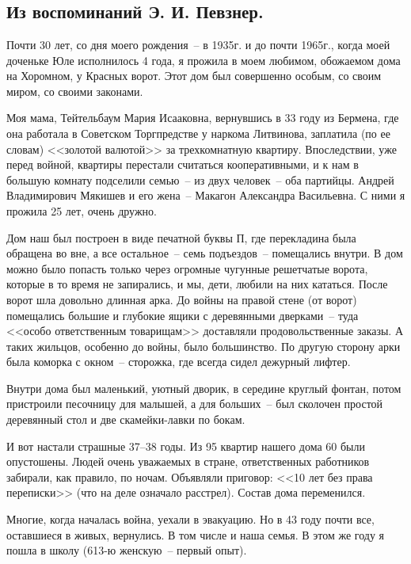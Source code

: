 \chapter{}

\section*{Из воспоминаний Э. И. Певзнер.}

Почти 30 лет, со дня моего рождения~-- в 1935г. и до почти 1965г., когда моей доченьке Юле исполнилось 4 года, я прожила в моем любимом, обожаемом дома на Хоромном, у Красных ворот. Этот дом был совершенно особым, со своим миром, со своими законами.

Моя мама, Тейтельбаум Мария Исааковна, вернувшись в 33 году из Бермена, где она работала в Советском Торгпредстве у наркома Литвинова, заплатила (по ее словам) <<золотой валютой>> за трехкомнатную квартиру. Впоследствии, уже перед войной, квартиры перестали считаться кооперативными, и к нам в большую комнату подселили семью~-- из двух человек~-- оба партийцы. Андрей Владимирович Мякишев и его жена~-- Макагон Александра Васильевна. С ними я прожила 25 лет, очень дружно.

Дом наш был построен в виде печатной буквы П, где перекладина была обращена во вне, а все остальное~-- семь подъездов~-- помещались внутри. В дом можно было попасть только через огромные чугунные решетчатые ворота, которые в то время не запирались, и мы, дети, любили на них кататься. После ворот шла довольно длинная арка. До войны на правой стене (от ворот) помещались большие и глубокие ящики с деревянными дверками~-- туда <<особо ответственным товарищам>> доставляли продовольственные заказы. А таких жильцов, особенно до войны, было большинство. По другую сторону арки была коморка с окном~-- сторожка, где всегда сидел дежурный лифтер.

Внутри дома был маленький, уютный дворик, в середине круглый фонтан, потом пристроили песочницу для малышей, а для больших~-- был сколочен простой деревянный стол и две скамейки-лавки по бокам.

И вот настали страшные 37--38 годы. Из 95 квартир нашего дома 60 были опустошены. Людей очень уважаемых в стране, ответственных работников забирали, как правило, по ночам. Объявляли приговор: <<10 лет без права переписки>> (что на деле означало расстрел). Состав дома переменился.

Многие, когда началась война, уехали в эвакуацию. Но в 43 году почти все, оставшиеся в живых, вернулись. В том числе и наша семья. В этом же году я пошла в школу (613-ю женскую~-- первый опыт).

